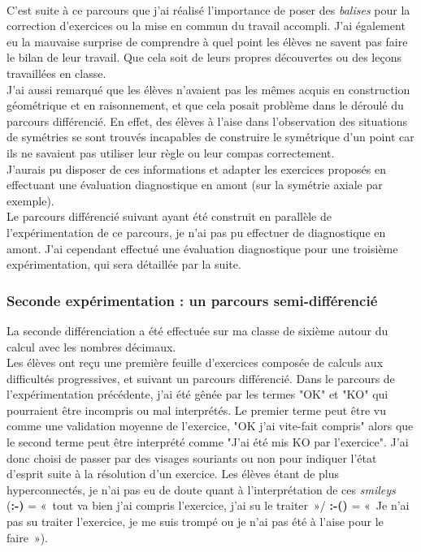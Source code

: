 \paragraph{}C'est suite à ce parcours que j'ai réalisé l'importance de poser des \textit{balises} pour la correction d'exercices ou la mise en commun du travail accompli. J'ai également eu la mauvaise surprise de comprendre à quel point les élèves ne savent pas faire le bilan de leur travail. Que cela soit de leurs propres découvertes ou des leçons travaillées en classe.\\
J'ai aussi remarqué que les élèves n'avaient pas les mêmes acquis en construction géométrique et en raisonnement, et que cela posait problème dans le déroulé du parcours différencié. En effet, des élèves à l'aise dans l'observation des situations de symétries se sont trouvés incapables de construire le symétrique d'un point car ils ne savaient pas utiliser leur règle ou leur compas correctement.\\
J'aurais pu disposer de ces informations et adapter les exercices proposés en effectuant une évaluation diagnostique en amont (sur la symétrie axiale par exemple).\\
Le parcours différencié suivant ayant été construit en parallèle de l'expérimentation de ce parcours, je n'ai pas pu effectuer de diagnostique en amont. J'ai cependant effectué une évaluation diagnostique pour une troisième expérimentation, qui sera détaillée par la suite.\\


\subsubsection{Seconde expérimentation : un parcours semi-différencié}
La seconde différenciation a été effectuée sur ma classe de sixième autour du calcul avec les nombres décimaux.\\
Les élèves ont reçu une première feuille d'exercices composée de calculs aux difficultés progressives, et suivant un parcours différencié. Dans le parcours de l'expérimentation précédente, j'ai été gênée par les termes "OK" et "KO" qui pourraient être incompris ou mal interprétés. Le premier terme peut être vu comme une validation moyenne de l'exercice, "OK j'ai vite-fait compris" alors que le second terme peut être interprété comme "J'ai été mis KO par l'exercice". J'ai donc choisi de passer par des visages souriants ou non pour indiquer l'état d'esprit suite à la résolution d'un exercice. Les élèves étant de plus hyperconnectés, je n'ai pas eu de doute quant à l'interprétation de ces \textit{smileys} (\textbf{:-)} = « tout va bien j'ai compris l'exercice, j'ai su le traiter »/  \textbf{:-()} = « Je n'ai pas su traiter l'exercice, je me suis trompé ou je n'ai pas été à l'aise pour le faire »).
